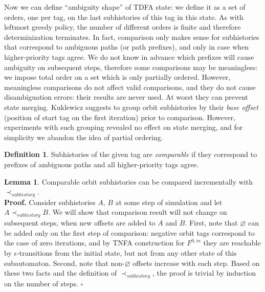 \documentclass{article}
\theoremstyle{definition}
\newtheorem{Xdef}{Definition}
\newtheorem{XLem}{Lemma}
\begin{document}
\begin{multicols}{2}
Now we can define ``ambiguity shape'' of TDFA state:
we define it as a set of orders, one per tag, on the last subhistories of this tag in this state.
As with leftmost greedy policy, the number of different orders is finite
and therefore determinization terminates.
In fact, comparison only makes sense for subhistories that correspond to ambiguous paths (or path prefixes),
and only in case when higher-priority tags agree.
We do not know in advance which prefixes will cause ambiguity on subsequent steps,
therefore some comparisons may be meaningless:
we impose total order on a set which is only partially ordered.
However, meaningless comparisons do not affect valid comparisons, and they do not cause disambiguation errors: their results are never used.
At worst they can prevent state merging.
Kuklewicz suggests to group orbit subhistories by their \emph{base offset}
(position of start tag on the first iteration) prior to comparison.
However, experiments with such grouping revealed no effect on state merging,
and for simplicity we abandon the idea of partial ordering.

\begin{Xdef}
Subhistories of the given tag are \emph{comparable} if they correspond to prefixes of ambiguous paths
and all higher-priority tags agree.
\end{Xdef}


\begin{XLem}\label{lemma_orbit_subhistories}
Comparable orbit subhistories can be compared incrementally with $\prec_{subhistory}$.
\\[0.5em]
\textbf{Proof.}
Consider subhistories $A$, $B$ at some step of simulation and let $A \prec_{subhistory} B$.
We will show that comparison result will not change on subsequent steps, when new offsets are added to $A$ and $B$.
First, note that $\varnothing$ can be added only on the first step of comparison:
negative orbit tags correspond to the case of zero iterations,
and by TNFA construction for $F^{0,m}$ they are reachable by $\epsilon$-transitions from the initial state,
but not from any other state of this subautomaton.
Second, note that non-$\varnothing$ offsets increase with each step.
Based on these two facts and the definition of $\prec_{subhistory}$, the proof is trivial by induction on the number of steps.
$\square$
\end{XLem}



\end{multicols}
\end{document}
